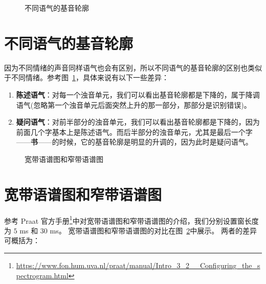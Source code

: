\begin{figure}[htp]
  \begin{center}

  \end{center}
  \caption{不同语气的基音轮廓}
  \label{fig:book}
\end{figure}

\section{不同语气的基音轮廓}
因为不同情绪的声音同样语气也会有区别，所以不同语气的基音轮廓的区别也类似于不同情绪。参考图~\ref{fig:book}，具体来说有以下一些差异：

\begin{enumerate}
\item \textbf{陈述语气}：对每一个浊音单元，我们可以看出基音轮廓都是下降的，属于降调语气(忽略第一个浊音单元后面突然上升的那一部分，那部分是识别错误)。
\item \textbf{疑问语气}：对前半部分的浊音单元，我们可以看出基音轮廓都是下降的，因为前面几个字基本上是陈述语气。而后半部分的浊音单元，尤其是最后一个字——\textbf{书}——的时候，它的基音轮廓是明显的升调的，因为此时是疑问语气。
\end{enumerate}

\begin{figure}[htp]
  \begin{center}

  \end{center}
  \caption{宽带语谱图和窄带语谱图}
  \label{fig:band}
\end{figure}


\section{宽带语谱图和窄带语谱图}
参考 Praat 官方手册\footnote{\url{https://www.fon.hum.uva.nl/praat/manual/Intro_3_2__Configuring_the_spectrogram.html}}中对宽带语谱图和窄带语谱图的介绍，我们分别设置窗长度为 $5$ ms 和 $30$ ms。
宽带语谱图和窄带语谱图的对比在图~\ref{fig:band}中展示。
两者的差异可概括为：

